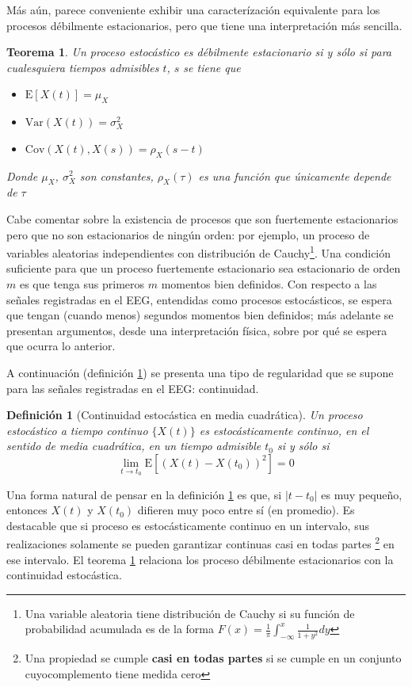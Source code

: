 \documentclass[12pt,a4paper]{mitthesis}
\newtheorem{defn}{Definici\'on}
\newtheorem{thrm}{Teorema}
\newcommand{\E}[1]{\mathrm{E}\left[ #1 \right]}
\newcommand{\Var}[1]{\mathrm{Var}\left( #1 \right)}
\newcommand{\Cov}[1]{\mathrm{Cov}\left( #1 \right)}
\newcommand{\abso}[1]{\left| #1 \right|}
\begin{document}
M\'as a\'un, parece conveniente exhibir una caracter\'izaci\'on equivalente para los procesos 
d\'ebilmente estacionarios, pero que tiene una interpretaci\'on m\'as sencilla.
\begin{thrm}
Un proceso estoc\'astico es d\'ebilmente estacionario si y s\'olo si para cualesquiera tiempos 
admisibles $t$, $s$ se tiene que
\begin{itemize}
\item $\E{X(t)} = \mu_X$
\item $\Var{X(t)} = \sigma^{2}_X$
\item $\Cov{X(t),X(s)} = \rho_X (s-t)$
\end{itemize}
Donde $\mu_X$, $\sigma^{2}_X$ son constantes, $\rho_X(\tau)$ es una funci\'on que \'unicamente 
depende de $\tau$
\label{est_usual}
\end{thrm}

Cabe comentar  sobre la existencia de procesos que son fuertemente estacionarios pero que no son 
estacionarios de ning\'un orden: por ejemplo, un proceso de variables aleatorias independientes con 
distribuci\'on de Cauchy\footnote{Una variable aleatoria tiene distribuci\'on de Cauchy si su 
funci\'on de probabilidad acumulada es de la forma 
$\displaystyle F(x) = \frac{1}{\pi} \int_{-\infty}^{x} \frac{1}{1+y^{2}} dy$}.
Una condici\'on suficiente para que un proceso fuertemente estacionario sea estacionario de orden 
$m$ es que tenga sus primeros $m$ momentos bien definidos.
Con respecto a las se\~nales registradas en el EEG, entendidas como procesos estoc\'asticos, se 
espera que tengan (cuando menos) segundos momentos bien definidos; m\'as adelante se presentan 
argumentos, desde una interpretaci\'on f\'isica, sobre por qu\'e se espera que ocurra lo anterior.

A continuaci\'on (definici\'on \ref{cont_est}) se presenta una tipo de regularidad que se supone
para las se\~nales registradas en el EEG: continuidad.

\begin{defn}[Continuidad estoc\'astica en media cuadr\'atica]
Un proceso estoc\'astico a tiempo continuo $\{ X(t) \}$ es estoc\'asticamente continuo, en el 
sentido de media cuadr\'atica, en un tiempo admisible $t_0$ si y s\'olo si
\begin{equation*}
\lim_{t \rightarrow t_0} \E{\left( X(t) - X(t_0) \right)^{2}} = 0
\end{equation*}
\label{cont_est}
\end{defn}

Una forma natural de pensar en la definici\'on \ref{cont_est} es que, si $\abso{t-t_0}$ es muy 
peque\~no, entonces $X(t)$ y $X(t_0)$ difieren muy poco entre s\'i (en promedio).
Es destacable que si proceso es estoc\'asticamente continuo en un intervalo, sus realizaciones 
solamente se pueden garantizar continuas casi en todas partes \footnote{Una propiedad se cumple 
\textbf{casi en todas partes} si se cumple en un conjunto cuyocomplemento tiene medida cero} en ese 
intervalo.
El teorema \ref{cont_est} relaciona los proceso d\'ebilmente estacionarios con la continuidad
estoc\'astica.
\end{document}
